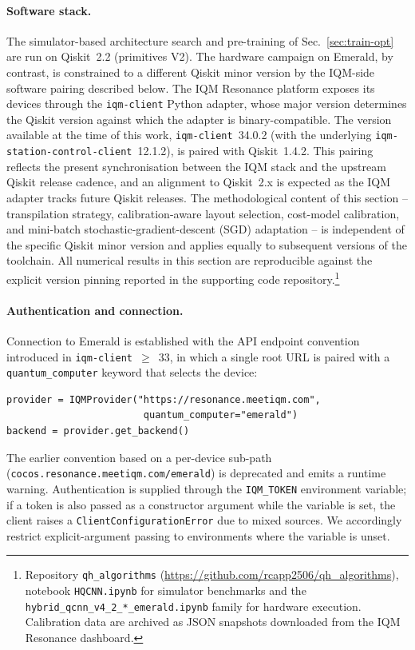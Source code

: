\paragraph{Software stack.}
The simulator-based architecture search and pre-training of Sec.~\ref{sec:train-opt} are run on Qiskit~2.2 (primitives V2). The hardware campaign on Emerald, by contrast, is constrained to a different Qiskit minor version by the IQM-side software pairing described below.
The IQM Resonance platform exposes its devices through the \texttt{iqm-client} Python adapter, whose major version determines the Qiskit version against which the adapter is binary-compatible. The version available at the time of this work, \texttt{iqm-client}~34.0.2 (with the underlying \texttt{iqm-station-control-client}~12.1.2), is paired with Qiskit~1.4.2. This pairing reflects the present synchronisation between the IQM stack and the upstream Qiskit release cadence, and an alignment to Qiskit~2.x is expected as the IQM adapter tracks future Qiskit releases. The methodological content of this section -- transpilation strategy, calibration-aware layout selection, cost-model calibration, and mini-batch stochastic-gradient-descent (SGD) adaptation -- is independent of the specific Qiskit minor version and applies equally to subsequent versions of the toolchain. All numerical results in this section are reproducible against the explicit version pinning reported in the supporting code repository.\footnote{Repository \texttt{qh\_algorithms} (\url{https://github.com/rcapp2506/qh_algorithms}), notebook \texttt{HQCNN.ipynb} for simulator benchmarks and the \texttt{hybrid\_qcnn\_v4\_2\_*\_emerald.ipynb} family for hardware execution. Calibration data are archived as JSON snapshots downloaded from the IQM Resonance dashboard.}

\paragraph{Authentication and connection.}
Connection to Emerald is established with the API endpoint convention introduced in \texttt{iqm-client}~$\geq$~33, in which a single root URL is paired with a \texttt{quantum\_computer} keyword that selects the device:
\begin{verbatim}
provider = IQMProvider("https://resonance.meetiqm.com",
                        quantum_computer="emerald")
backend = provider.get_backend()
\end{verbatim}
The earlier convention based on a per-device sub-path (\texttt{cocos.resonance.meetiqm.com/emerald}) is deprecated and emits a runtime warning. Authentication is supplied through the \texttt{IQM\_TOKEN} environment variable; if a token is also passed as a constructor argument while the variable is set, the client raises a \texttt{ClientConfigurationError} due to mixed sources. We accordingly restrict explicit-argument passing to environments where the variable is unset.

